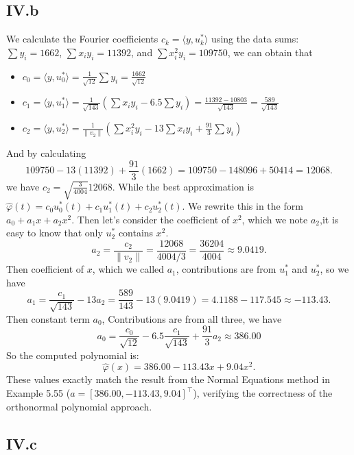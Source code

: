 \documentclass[a4paper]{article}
\begin{document}
\subsection*{IV.b}
We calculate the Fourier coefficients $c_k = \langle y, u_k^* \rangle$ using the data sums: $\sum y_i = 1662$, $\sum x_i y_i = 11392$, and $\sum x_i^2 y_i = 109750$, we can obtain that

\begin{itemize}
  \item $c_0 = \langle y, u_0^* \rangle = \frac{1}{\sqrt{12}} \sum y_i = \frac{1662}{\sqrt{12}}$
  \item $c_1 = \langle y, u_1^* \rangle = \frac{1}{\sqrt{143}} (\sum x_i y_i - 6.5 \sum y_i) = \frac{11392 - 10803}{\sqrt{143}} = \frac{589}{\sqrt{143}}$
  \item $c_2 = \langle y, u_2^* \rangle = \frac{1}{\|v_2\|} (\sum x_i^2 y_i - 13 \sum x_i y_i + \frac{91}{3} \sum y_i)$
\end{itemize}
And by calculating 
   \[ 109750 - 13(11392) + \frac{91}{3}(1662) = 109750 - 148096 + 50414 = 12068. \]
we have $c_2 = \sqrt{\frac{3}{4004}}12068$.
While the best approximation is $\hat{\varphi}(t) = c_0 u_0^*(t) + c_1 u_1^*(t) + c_2 u_2^*(t)$. We rewrite this in the form $a_0 + a_1 x + a_2 x^2$.\newline
Then let's consider the coefficient of $x^2$, which we note $a_2$,it is easy to know that only $u_2^*$ contains $x^2$.
\[ a_2 = \frac{c_2}{\|v_2\|} = \frac{12068}{4004/3} = \frac{36204}{4004} \approx {9.0419}. \]
Then coefficient of $x$, which we called $a_1$, contributions are from $u_1^*$ and $u_2^*$, so we have
\[ a_1 = \frac{c_1}{\sqrt{143}} - 13 a_2 = \frac{589}{143} - 13(9.0419) = 4.1188 - 117.545 \approx {-113.43}. \]\newline 
Then constant term $a_0$, Contributions are from all three, we have
\[ a_0 = \frac{c_0}{\sqrt{12}} - 6.5 \frac{c_1}{\sqrt{143}} + \frac{91}{3} a_2 \approx {386.00}\]
So the computed polynomial is:
\[ \hat{\varphi}(x) = 386.00 - 113.43 x + 9.04 x^2. \]
These values exactly match the result from the Normal Equations method in Example 5.55 ($a = [386.00, -113.43, 9.04]^\top$), verifying the correctness of the orthonormal polynomial approach.


\subsection*{IV.c}
\end{document}
